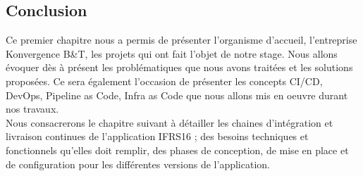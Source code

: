 \begin{spacing}{1.2}
\FloatBarrier
\section*{Conclusion}

Ce premier chapitre nous a permis de présenter l'organisme d’accueil, l'entreprise Konvergence B\&T, les projets qui ont fait l’objet  de notre stage. Nous allons évoquer dès à présent  les problématiques que nous avons traitées et les solutions proposées. Ce  sera également l’occasion de présenter les concepts CI/CD, DevOps, Pipeline as Code, Infra as Code que nous allons mis en oeuvre durant nos travaux.\\

Nous consacrerons le chapitre suivant à détailler les chaines d'intégration et livraison continues de l'application IFRS16 ;  des besoins techniques et fonctionnels qu’elles doit remplir,  des phases de conception, de mise en place et de configuration pour les différentes versions de l'application. 



\end{spacing}
